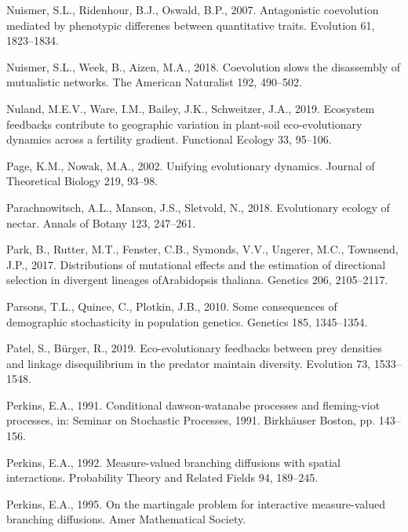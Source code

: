 \documentclass[]{elsarticle} %
\begin{document}
\leavevmode\hypertarget{ref-Nuismer2007}{}%
Nuismer, S.L., Ridenhour, B.J., Oswald, B.P., 2007. Antagonistic
coevolution mediated by phenotypic differenes between quantitative
traits. Evolution 61, 1823--1834.

\leavevmode\hypertarget{ref-Nuismer2018}{}%
Nuismer, S.L., Week, B., Aizen, M.A., 2018. Coevolution slows the
disassembly of mutualistic networks. The American Naturalist 192,
490--502.

\leavevmode\hypertarget{ref-VanNuland2019}{}%
Nuland, M.E.V., Ware, I.M., Bailey, J.K., Schweitzer, J.A., 2019.
Ecosystem feedbacks contribute to geographic variation in plant-soil
eco-evolutionary dynamics across a fertility gradient. Functional
Ecology 33, 95--106.

\leavevmode\hypertarget{ref-PAGE2002}{}%
Page, K.M., Nowak, M.A., 2002. Unifying evolutionary dynamics. Journal
of Theoretical Biology 219, 93--98.

\leavevmode\hypertarget{ref-Parachnowitsch2018}{}%
Parachnowitsch, A.L., Manson, J.S., Sletvold, N., 2018. Evolutionary
ecology of nectar. Annals of Botany 123, 247--261.

\leavevmode\hypertarget{ref-Park2017}{}%
Park, B., Rutter, M.T., Fenster, C.B., Symonds, V.V., Ungerer, M.C.,
Townsend, J.P., 2017. Distributions of mutational effects and the
estimation of directional selection in divergent lineages ofArabidopsis
thaliana. Genetics 206, 2105--2117.

\leavevmode\hypertarget{ref-Parsons2010}{}%
Parsons, T.L., Quince, C., Plotkin, J.B., 2010. Some consequences of
demographic stochasticity in population genetics. Genetics 185,
1345--1354.

\leavevmode\hypertarget{ref-Patel2019}{}%
Patel, S., Bürger, R., 2019. Eco-evolutionary feedbacks between prey
densities and linkage disequilibrium in the predator maintain diversity.
Evolution 73, 1533--1548.

\leavevmode\hypertarget{ref-Perkins1991}{}%
Perkins, E.A., 1991. Conditional dawson-watanabe processes and
fleming-viot processes, in: Seminar on Stochastic Processes, 1991.
Birkhäuser Boston, pp. 143--156.

\leavevmode\hypertarget{ref-Perkins1992}{}%
Perkins, E.A., 1992. Measure-valued branching diffusions with spatial
interactions. Probability Theory and Related Fields 94, 189--245.

\leavevmode\hypertarget{ref-edwinarendperkins1995}{}%
Perkins, E.A., 1995. On the martingale problem for interactive
measure-valued branching diffusions. Amer Mathematical Society.
\end{document}
